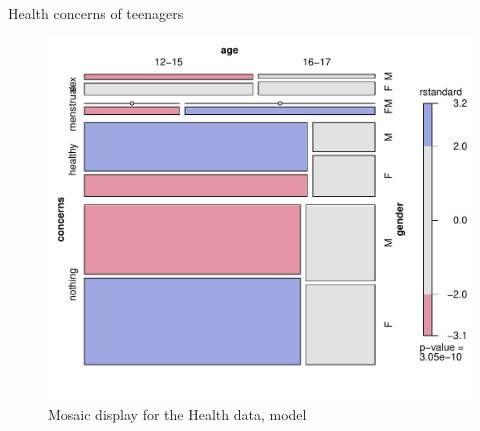 \documentclass[11pt]{book}\usepackage[]{graphicx}\usepackage[]{color}
\newenvironment{knitrout}{}{} %
\renewenvironment{knitrout}{\small\renewcommand{\baselinestretch}{.85}}{} %
\begin{document}
\begin{Example}[health]{Health concerns of teenagers}
\begin{knitrout}
\begin{figure}[!htbp]
\centerline{\includegraphics[width=.6\textwidth]{ch08/fig/health-mosaic-1} }

\caption[Mosaic display for the Health data, model health.glm1]{Mosaic display for the Health data, model \label{fig:health-mosaic}}
\end{figure}



\end{knitrout}
\end{Example}
\end{document}
